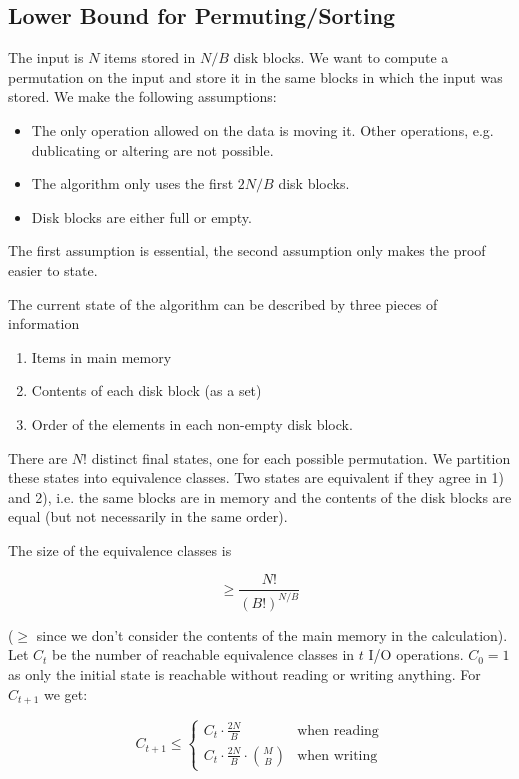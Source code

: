\subsection{Lower Bound for Permuting/Sorting}

The input is $N$ items stored in $N/B$ disk blocks. We want to compute a permutation on the input and store it in the same blocks in which the input was stored. We make the following assumptions:

\begin{itemize}
\item The only operation allowed on the data is moving it. Other operations, e.g. dublicating or altering are not possible.
\item The algorithm only uses the first $2N/B$ disk blocks.
\item Disk blocks are either full or empty.
\end{itemize}

The first assumption is essential, the second assumption only makes the proof easier to state.

The current state of the algorithm can be described by three pieces of information

\begin{enumerate}
\item Items in main memory
\item Contents of each disk block (as a set)
\item Order of the elements in each non-empty disk block.
\end{enumerate}

There are $N!$ distinct final states, one for each possible permutation. We partition these states into equivalence classes. Two states are equivalent if they agree in 1) and 2), i.e. the same blocks are in memory and the contents of the disk blocks are equal (but not necessarily in the same order).

The size of the equivalence classes is

\[\geq \frac{N!}{(B!)^{N/B}}\]

($\geq$ since we don't consider the contents of the main memory in the calculation). Let $C_t$ be the number of reachable equivalence classes in $t$ I/O operations. $C_0=1$ as only the initial state is reachable without reading or writing anything. For $C_{t+1}$ we get:

\[C_{t+1} \leq \begin{cases}
C_t \cdot \frac{2N}{B}	& \text{when reading}\\
C_t \cdot \frac{2N}{B} \cdot {{M}\choose{B}}	& \text{when writing}
\end{cases}\]


